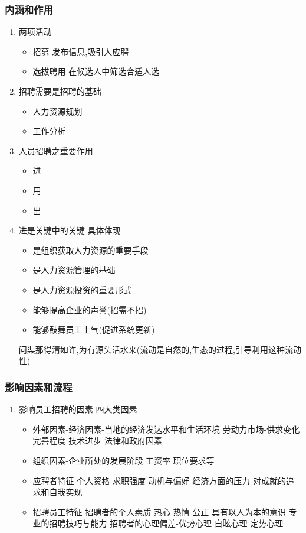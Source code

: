 \documentclass{ctexart}
\begin{document}
\subsubsection{内涵和作用}
\label{sec-2-1-1}
\begin{enumerate}
\item 两项活动
\label{sec-2-1-1-1}
\begin{itemize}
\item 招募 发布信息,吸引人应聘
\item 选拔聘用 在候选人中筛选合适人选
\end{itemize}
\item 招聘需要是招聘的基础
\label{sec-2-1-1-2}
\begin{itemize}
\item 人力资源规划
\item 工作分析
\end{itemize}
\item 人员招聘之重要作用
\label{sec-2-1-1-3}
\begin{itemize}
\item 进
\item 用
\item 出
\end{itemize}
\item 进是关键中的关键
\label{sec-2-1-1-4}
具体体现
\begin{itemize}
\item 是组织获取人力资源的重要手段
\item 是人力资源管理的基础
\item 是人力资源投资的重要形式
\item 能够提高企业的声誉(招需不招)
\item 能够鼓舞员工士气(促进系统更新)
\end{itemize}
问渠那得清如许,为有源头活水来(流动是自然的,生态的过程,引导利用这种流动性)
\end{enumerate}
\subsubsection{影响因素和流程}
\label{sec-2-1-2}
\begin{enumerate}
\item 影响员工招聘的因素
\label{sec-2-1-2-1}
四大类因素
\begin{itemize}
\item 外部因素-经济因素-当地的经济发达水平和生活环境
劳动力市场-供求变化 完善程度
技术进步
法律和政府因素
\item 组织因素-企业所处的发展阶段
工资率
职位要求等
\item 应聘者特征-个人资格
求职强度
动机与偏好-经济方面的压力
          对成就的追求和自我实现
\item 招聘员工特征-招聘者的个人素质-热心 热情 公正
                具有以人为本的意识
                专业的招聘技巧与能力
招聘者的心理偏差-优势心理
                自眩心理
                定势心理
\end{itemize}
\end{enumerate}
\end{document}
